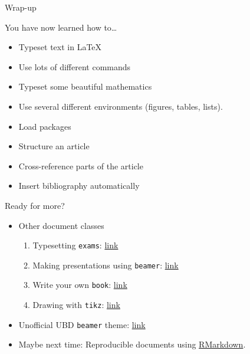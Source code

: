\documentclass[,aspectratio=43]{beamer}
\providecommand{\tightlist}{%
  \setlength{\itemsep}{0pt}\setlength{\parskip}{0pt}}
\begin{document}
\begin{frame}{Wrap-up}
\protect\hypertarget{wrap-up}{}
\begin{center}
\end{center}

You have now learned how to\ldots{}

\begin{itemize}
\tightlist
\item
  Typeset text in \LaTeX
\item
  Use lots of different commands
\item
  Typeset some beautiful mathematics
\item
  Use several different environments (figures, tables, lists).
\item
  Load packages
\item
  Structure an article
\item
  Cross-reference parts of the article
\item
  Insert bibliography automatically
\end{itemize}
\end{frame}

\begin{frame}[fragile]{Ready for more?}
\protect\hypertarget{ready-for-more}{}
\begin{itemize}
\item
  Other document classes

  \begin{enumerate}
  \tightlist
  \item
    Typesetting \texttt{exams}:
    \href{https://www.overleaf.com/learn/latex/Typesetting_exams_in_LaTeX}{link}
  \item
    Making presentations using \texttt{beamer}:
    \href{https://www.overleaf.com/learn/latex/Beamer_Presentations\%3A_A_Tutorial_for_Beginners_(Part_1)—Getting_Started}{link}
  \item
    Write your own \texttt{book}:
    \href{https://www.overleaf.com/gallery/tagged/book}{link}
  \item
    Drawing with \texttt{tikz}: \href{http://texample.net/tikz/}{link}
  \end{enumerate}
\item
  Unofficial UBD \texttt{beamer} theme:
  \href{https://github.com/haziqj/ubd-beamer}{link}
\item
  Maybe next time: Reproducible documents using
  \href{https://rmarkdown.rstudio.com}{RMarkdown}.
\end{itemize}
\end{frame}
\end{document}
